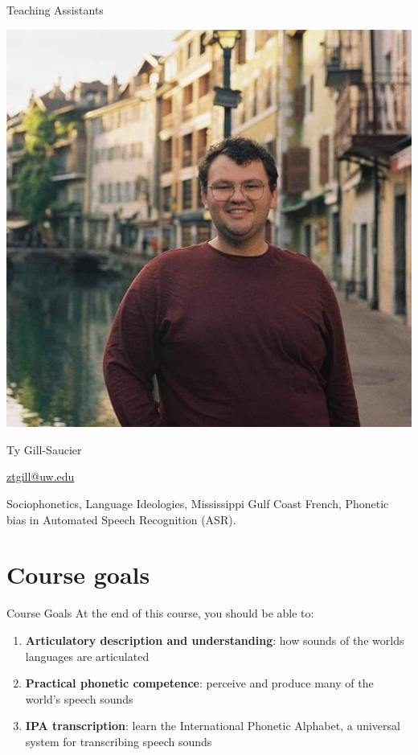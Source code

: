 \documentclass{beamer}
\begin{document}
\begin{frame}{Teaching Assistants}
    \begin{multicols}{2}
        \begin{center}
            \includegraphics[width=0.9\linewidth]{figs/Gill_2022.jpg} %
        \end{center}
        \columnbreak
        \begin{description}[font=\bfseries]
            \item[Name:] Ty Gill-Saucier
            \item[Contact:] \href{mailto:ztgill@uw.edu}{ztgill@uw.edu}
            \item[Research Interests:] Sociophonetics, Language
            Ideologies, Mississippi Gulf Coast French, Phonetic bias in
            Automated Speech Recognition (ASR).
        \end{description}
    \end{multicols}
\end{frame}

\section{Course goals}
\begin{frame}{Course Goals}
    At the end of this course, you should be able to:
    \begin{enumerate}
        \item \textbf{Articulatory description and understanding}: how sounds of the worlds languages are articulated
        \item \textbf{Practical phonetic competence}: perceive and produce many of the world’s speech sounds
        \item \textbf{IPA transcription}: learn the International Phonetic Alphabet, a universal system for transcribing speech sounds
    \end{enumerate}
\end{frame}
\end{document}
